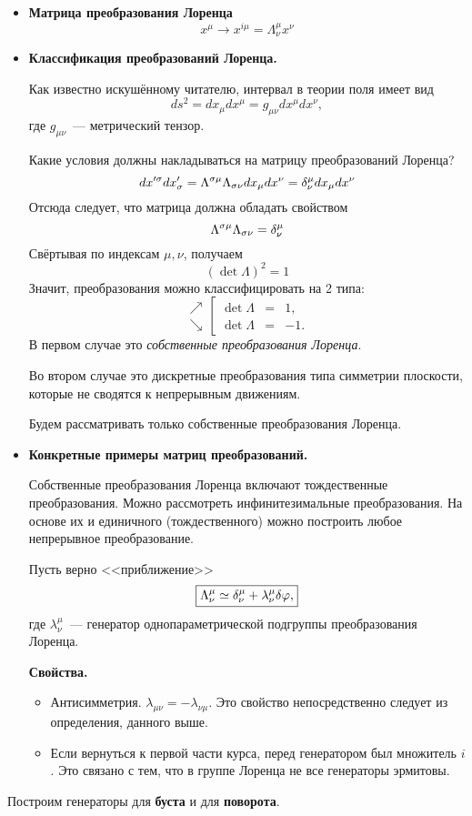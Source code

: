 \begin{itemize}
  \item \textbf{Матрица преобразования Лоренца}
$$
    x^\mu \to x^{i \mu} = \Lambda_\nu^\mu x^\nu
$$
  \item \textbf{Классификация преобразований Лоренца.}
  
  Как известно искушённому читателю, интервал в теории поля имеет вид
  $$
    ds^2 = dx_\mu dx^\mu = g_{\mu \nu} dx^{\mu} dx^{\nu},
  $$
  где $g_{\mu\nu}$~--- метрический тензор.
  
  Какие условия должны накладываться на матрицу преобразований Лоренца?
  $$
    dx'^{\sigma} dx'_{\sigma} = \Lambda^{\sigma\mu}\Lambda_{\sigma \nu} dx_{\mu} dx^{\nu} = \delta_{\nu}^{\mu} dx_{\mu} dx^{\nu}
  $$
  Отсюда следует, что матрица должна обладать свойством
  $$
    \Lambda^{\sigma\mu} \Lambda_{\sigma \nu} = \delta^\mu_\nu
  $$
  Свёртывая по индексам $\mu, \nu$, получаем
  $$
    (\det \Lambda)^2 = 1
  $$
  Значит, преобразования можно классифицировать на 2 типа:
  $$    
    \begin{array}{lcl}
         \nearrow \\
         \searrow
    \end{array}
    \left[
      \begin{array}{lcl}
        \det \Lambda &=& 1 ,\\
        \det \Lambda &=& -1.
      \end{array}
    \right.
  $$
  В первом случае это \emph{собственные преобразования Лоренца}.
  
  Во втором случае это дискретные преобразования типа симметрии плоскости, которые не сводятся к непрерывным движениям.
  
  Будем рассматривать только собственные преобразования Лоренца.
  \item \textbf{Конкретные примеры матриц преобразований.}
  
  Собственные преобразования Лоренца включают тождественные преобразования. Можно рассмотреть инфинитезимальные преобразования. На основе их и единичного (тождественного) можно построить любое непрерывное преобразование.
  
  Пусть верно <<приближение>>
  $$
  \boxed{
    \Lambda_{\nu}^{\mu} \simeq \delta^\mu_{\nu} + \lambda_\nu^{\mu} \delta \varphi,
  }
  $$
  где $\lambda_{\nu}^{\mu}$~--- генератор однопараметрической подгруппы преобразования Лоренца.
  
  \textbf{Свойства.}
  \begin{itemize}
    \item Антисимметрия. $\lambda_{\mu\nu} = -\lambda_{\nu\mu}$. Это свойство непосредственно следует из определения, данного выше.
    \item Если вернуться к первой части курса, перед генератором был множитель $i$. Это связано с тем, что в группе Лоренца не все генераторы эрмитовы.
  \end{itemize}
\end{itemize}
Построим генераторы для \textbf{буста} и для \textbf{поворота}.

